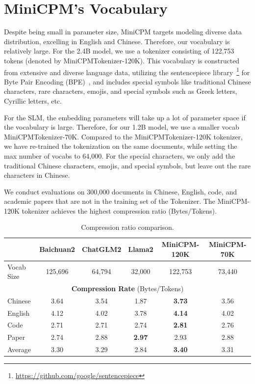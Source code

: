 \section{MiniCPM's Vocabulary}
\label{app:tokenizer}

Despite being small in parameter size, MiniCPM targets modeling diverse data distribution, excelling in English and Chinese. Therefore, our vocabulary is relatively large. For the 2.4B model, we use a tokenizer consisting of 122,753 tokens (denoted by MiniCPMTokenizer-120K). This vocabulary is constructed from extensive and diverse language data, utilizing the sentencepiece library~\footnote{\url{https://github.com/google/sentencepiece}} for Byte Pair Encoding (BPE)~\citep{sennrich-etal-2016-neural}, and includes special symbols like traditional Chinese characters, rare characters, emojis, and special symbols such as Greek letters, Cyrillic letters, etc.

For the SLM, the embedding parameters will take up a lot of parameter space if the vocabulary is large. Therefore, for our 1.2B model, we use a smaller vocab MiniCPMTokenizer-70K. Compared to the MiniCPMTokenizer-120K tokenizer, we have re-trained the tokenization on the same documents, while setting the max number of vocabs to 64,000. For the special characters, we only add the traditional Chinese characters, emojis, and special symbols, but leave out the rare characters in Chinese. 

We conduct evaluations on 300,000 documents in Chinese, English, code, and academic papers that are not in the training set of the Tokenizer. The MiniCPM-120K tokenizer achieves the highest compression ratio (Bytes/Tokens).



\begin{table}[htbp]
\centering
\begin{tabular}{lccccc}
\toprule
  & {\textbf{Baichuan2}}  & {\textbf{ChatGLM2}} & {\textbf{Llama2}} & {\textbf{MiniCPM-120K}}  & {\textbf{MiniCPM-70K}}\\
\midrule
Vocab Size & 125,696 & 64,794 & 32,000 & 122,753 & 73,440\\
\midrule
\multicolumn{6}{c}{\textbf{Compression Rate} (Bytes/Tokens) }\\
\midrule
Chinese & 3.64   & 3.54  & 1.87  & \textbf{3.73} &  3.56 \\
English & 4.12   & 4.02  & 3.78  & \textbf{4.14} & 4.02 \\
Code    & 2.71   & 2.71  & 2.74  & \textbf{2.81} & 2.76 \\
Paper   & 2.74   & 2.88  & \textbf{2.97}  & 2.93 & 2.88\\
\midrule
Average & 3.30   & 3.29  & 2.84  & \textbf{3.40}  & 3.31 \\
\bottomrule
\end{tabular}
\caption{Compression ratio comparison.}
\label{tab:compression_ratio}
\end{table}

